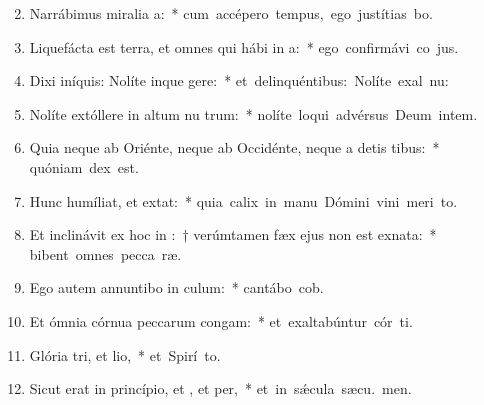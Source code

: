 \begin{flushleft}
\begin{enumerate}[leftmargin=*]
\setcounter{enumi}{1}

\item Narrábimus miralia a:~* \mbox{cum accépero tempus, ego justítias bo.}

\item Liquefácta est terra, et omnes qui hábi in a:~* \mbox{ego confirmávi co jus.}

\item Dixi iníquis: Nolíte inque gere:~* \mbox{et delinquéntibus: Nolíte exal nu:}

\item Nolíte extóllere in altum nu trum:~* \mbox{nolíte loqui advérsus Deum intem.}

\item Quia neque ab Oriénte, neque ab Occidénte, neque a detis tibus:~* \mbox{quóniam  dex est.}

\item Hunc humíliat, et  extat:~* \mbox{quia calix in manu Dómini vini meri  to.}

\item Et inclinávit ex hoc in :~† verúmtamen fæx ejus non est exnata:~* \mbox{bibent omnes pecca ræ.}

\item Ego autem annuntibo in culum:~* \mbox{cantábo  cob.}

\item Et ómnia córnua peccarum congam:~* \mbox{et exaltabúntur cór ti.}

\item Glória tri, et lio,~* \mbox{et Spirí to.}

\item Sicut erat in princípio, et , et per,~* \mbox{et in sǽcula sæcu. men.}

\end{enumerate}
\end{flushleft}